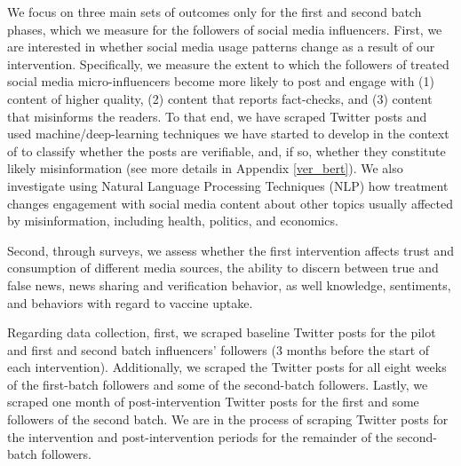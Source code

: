 We focus on three main sets of outcomes only for the first and second batch phases, which we measure for the followers of social media influencers. First, we are interested in whether social media usage patterns change as a result of our intervention. Specifically, we measure the extent to which the followers of treated social media micro-influencers become more likely to post and engage with (1) content of higher quality, (2) content that reports fact-checks, and (3) content that misinforms the readers. To that end, we have scraped Twitter posts and used machine/deep-learning techniques we have started to develop in the context of \cite{Bandieraetal2023} to classify whether the posts are verifiable, and, if so, whether they constitute likely misinformation (see more details in Appendix \ref{ver_bert}). We also investigate using Natural Language Processing Techniques (NLP) how treatment changes engagement with social media content about other topics usually affected by misinformation, including health, politics, and economics. 

Second, through surveys, we assess whether the first intervention affects trust and consumption of different media sources, the ability to discern between true and false news, news sharing and verification behavior, as well knowledge, sentiments, and behaviors with regard to vaccine uptake. 

Regarding data collection, first, we scraped baseline Twitter posts for the pilot and first and second batch influencers' followers (3 months before the start of each intervention). Additionally, we scraped the Twitter posts for all eight weeks of the first-batch followers and some of the second-batch followers. Lastly, we scraped one month of post-intervention Twitter posts for the first and some followers of the second batch. We are in the process of scraping Twitter posts for the intervention and post-intervention periods for the remainder of the second-batch followers.


